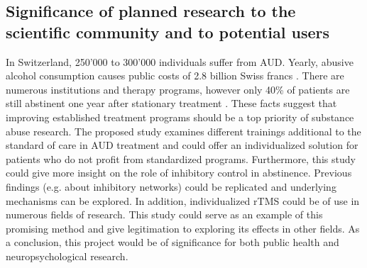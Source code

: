 \documentclass[12pt]{article}
\begin{document}
\subsection{Significance of planned research to the scientific community and to potential users}
In Switzerland, 250’000 to 300’000 individuals suffer from AUD. Yearly, abusive alcohol consumption causes public costs of 2.8 billion Swiss francs \parencite{AlkoholUndAlkoholpravention2021}. There are numerous institutions and therapy programs, however only 40\% of patients are still abstinent one year after stationary treatment \parencite{moggiSubstanceUseDisorder2007}. These facts suggest that improving established treatment programs should be a top priority of substance abuse research. The proposed study examines different trainings additional to the standard of care in AUD treatment and could offer an individualized solution for patients who do not profit from standardized programs. 
Furthermore, this study could give more insight on the role of inhibitory control in abstinence. Previous findings (e.g. about inhibitory networks) could be replicated and underlying mechanisms can be explored.
In addition, individualized rTMS could be of use in numerous fields of research. This study could serve as an example of this promising method and give legitimation to exploring its effects in other fields.
As a conclusion, this project would be of significance for both public health and neuropsychological research.



\printbibliography  
\end{document}
